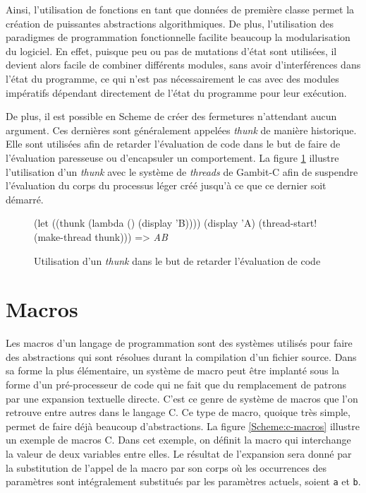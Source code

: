 \documentclass[12pt,twoside,letterpaper,francais]{book}
\newcommand{\scheme}[1]{\selectlanguage{english}{\tt #1}\selectlanguage{french}}
\newcommand{\schemeresult}[1]{{\it #1}}
\begin{document}
Ainsi, l'utilisation de fonctions en tant que données de première
classe permet la création de puissantes abstractions
algorithmiques. De plus, l'utilisation des paradigmes de programmation
fonctionnelle facilite beaucoup la modularisation du logiciel. En
effet, puisque peu ou pas de mutations d'état sont utilisées, il
devient alors facile de combiner différents modules, sans avoir
d'interférences dans l'état du programme, ce qui n'est pas
nécessairement le cas avec des modules impératifs dépendant
directement de l'état du programme pour leur exécution.

De plus, il est possible en Scheme de créer des fermetures
n'attendant aucun argument. Ces dernières sont généralement appelées
\textit{thunk} de manière historique. Elle sont utilisées afin de
retarder l'évaluation de code dans le but de faire de l'évaluation
paresseuse ou d'encapsuler un comportement. La figure
\ref{Scheme:thunk} illustre l'utilisation d'un \textit{thunk} avec le
système de \textit{threads} de Gambit-C afin de suspendre l'évaluation
du corps du processus léger créé jusqu'à ce que ce dernier soit
démarré.\\

\begin{figure}[htb!]
  \begin{schemecode}
(let ((thunk (lambda () (display 'B))))
  (display 'A)
  (thread-start! (make-thread thunk))) => \schemeresult{AB}
  \end{schemecode}
  \caption{Utilisation d'un \textit{thunk} dans le but de retarder
    l'évaluation de code}
  \label{Scheme:thunk}
\end{figure}


\FloatBarrier
\section{Macros} \label{Scheme:macros}
Les macros d'un langage de programmation sont des systèmes utilisés
pour faire des abstractions qui sont résolues durant la compilation
d'un fichier source. Dans sa forme la plus élémentaire, un système de
macro peut être implanté sous la forme d'un pré-processeur de code qui
ne fait que du remplacement de patrons par une expansion textuelle
directe. C'est ce genre de système de macros que l'on retrouve entre
autres dans le langage C. Ce type de macro, quoique très simple,
permet de faire déjà beaucoup d'abstractions. La figure
\ref{Scheme:c-macros} illustre un exemple de macros C. Dans cet
exemple, on définit la macro \scheme{swap} qui interchange la valeur
de deux variables entre elles. Le résultat de l'expansion sera donné
par la substitution de l'appel de la macro par son corps où les
occurrences des paramètres sont intégralement substitués par les
paramètres actuels, soient \texttt{a} et \texttt{b}.\\
\end{document}

